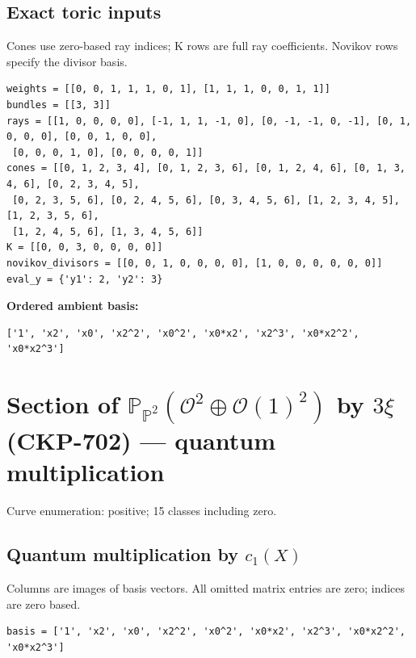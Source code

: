 \documentclass[10pt,a4paper]{article}
\begin{document}
\subsection*{Exact toric inputs}
Cones use zero-based ray indices; K rows are full ray coefficients. Novikov rows specify the divisor basis.

\begin{lstlisting}
weights = [[0, 0, 1, 1, 1, 0, 1], [1, 1, 1, 0, 0, 1, 1]]
bundles = [[3, 3]]
rays = [[1, 0, 0, 0, 0], [-1, 1, 1, -1, 0], [0, -1, -1, 0, -1], [0, 1, 0, 0, 0], [0, 0, 1, 0, 0],
 [0, 0, 0, 1, 0], [0, 0, 0, 0, 1]]
cones = [[0, 1, 2, 3, 4], [0, 1, 2, 3, 6], [0, 1, 2, 4, 6], [0, 1, 3, 4, 6], [0, 2, 3, 4, 5],
 [0, 2, 3, 5, 6], [0, 2, 4, 5, 6], [0, 3, 4, 5, 6], [1, 2, 3, 4, 5], [1, 2, 3, 5, 6],
 [1, 2, 4, 5, 6], [1, 3, 4, 5, 6]]
K = [[0, 0, 3, 0, 0, 0, 0]]
novikov_divisors = [[0, 0, 1, 0, 0, 0, 0], [1, 0, 0, 0, 0, 0, 0]]
eval_y = {'y1': 2, 'y2': 3}
\end{lstlisting}

\textbf{Ordered ambient basis:}
\begin{lstlisting}
['1', 'x2', 'x0', 'x2^2', 'x0^2', 'x0*x2', 'x2^3', 'x0*x2^2', 'x0*x2^3']
\end{lstlisting}

\clearpage\section*{Section of $\mathbb P_{\mathbb P^{2}}(\mathcal O^{2}\oplus \mathcal O(1)^{2})$ by $3\xi $ (CKP-702) --- quantum multiplication}

Curve enumeration: positive; 15 classes including zero.
\subsection*{Quantum multiplication by $c_1(X)$}
Columns are images of basis vectors. All omitted matrix entries are zero; indices are zero based.

\begin{lstlisting}
basis = ['1', 'x2', 'x0', 'x2^2', 'x0^2', 'x0*x2', 'x2^3', 'x0*x2^2', 'x0*x2^3']
\end{lstlisting}
\end{document}
